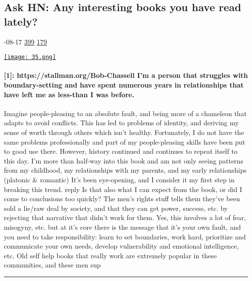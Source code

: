 \documentclass[10pt,a4paper]{article}
\begin{document}
\begin{multicols*}{2}

\noindent\begin{minipage}{\linewidth}
\subsection{Ask HN: Any interesting books you have read lately?}
\textsc{\footnotesize
{\scriptsize\faCalendar}-08-17 
{\scriptsize\faThumbsOUp}\space 
\href{http://news.ycombinator.com/item?id=37133657\&utm\_term=comment}{399} 
{\scriptsize\faComments}\space 
\href{http://news.ycombinator.com/item?id=37133657\&utm\_term=comment}{179} 
}
\par\medskip\noindent
\href{https://news.ycombinator.com/item?id=37156372\&utm\_source=hackernewsletter\&utm\_medium=email\&utm\_term=books}{
    \texttt{[image: 35.png]}
}
\end{minipage}
\paragraph{}
\textbf{[1]: https://stallman.org/Bob-Chassell
I'm a person that struggles with boundary-setting and have spent numerous years in relationships that have left me as less-than I was before.}
\paragraph{}
 Imagine people-pleasing to an absolute fault, and being more of a chameleon that adapts to avoid conflicts. This has led to problems of identity, and deriving my sense of worth through others which isn't healthy.
Fortunately, I do not have the same problems professionally and part of my people-pleasing skills have been put to good use there.
However, history continued and continues to repeat itself to this day. I'm more than half-way into this book and am not only seeing patterns from my childhood, my relationships with my parents, and my early relationships (platonic \& romantic)
It's been eye-opening, and I consider it my first step in breaking this trend.
reply
Is that also what I can expect from the book, or did I come to conclusions too quickly?
The men's rights stuff tells them they've been sold a lie/raw deal by society, and that they can get power, success, etc. by rejecting that narrative that didn't work for them. Yes, this involves a lot of fear, misogyny, etc. but at it's core there is the message that it's your own fault, and you need to take responsibility: learn to set boundaries, work hard, prioritize and communicate your own needs, develop vulnerability and emotional intelligence, etc. Old self help books that really work are extremely popular in these communities, and these men sup
\par\noindent\textcolor{red}{\rule{\linewidth}{0.2mm}}
\vfill
\null
\noindent\begin{minipage}{\linewidth}

\end{minipage}
\end{multicols*}
\end{document}
